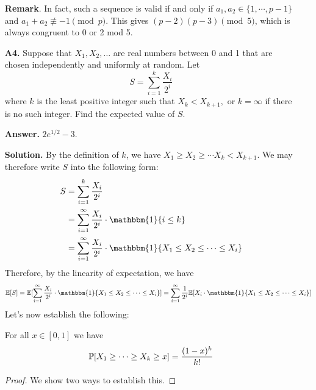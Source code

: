\documentclass[11pt,a4paper]{article}
\begin{document}
\begin{enumerate}
		\textbf{Remark}. In fact, such a sequence is valid if and only if $a_1, a_2\in \{1, \cdots, p-1\}$ and $a_1+a_2\not\equiv -1\pmod{p}$. 
		This gives $(p-2)(p-3)\pmod{5}$, which is always congruent to 0 or 2 mod 5. 
		
		\item [\textbf{A4.}]
		Suppose that $X_1, X_2, \ldots$ are real numbers between 0 and 1 that are chosen independently and uniformly at random. Let \[S=\sum_{i=1}^k \frac{X_i}{2^i}\] 
		where $k$ is the least positive integer such that $X_k<X_{k+1},$ or $k=\infty$ if there is no such integer. Find the expected value of $S.$
		
		\textbf{Answer.} $2e^{1/2}-3$. 
		
		\textbf{Solution.} 
		By the definition of $k$, we have $X_1\ge X_2\ge \cdots X_k < X_{k + 1}$. 
		We may therefore write $S$ into the following form: 
		\begin{align}
			S&=\sum_{i=1}^k \frac{X_i}{2^i} 
			\nonumber\\
			&=\sum_{i=1}^{\infty} \frac{X_i}{2^i} \cdot \mathbbm{1}\{i\le k\}
			\nonumber\\
			&=\sum_{i=1}^{\infty} \frac{X_i}{2^i} \cdot \mathbbm{1}\{X_1\le X_2\le \cdots \le X_i\}
		\end{align}
	    Therefore, by the linearity of expectation, we have 
	    \begin{align}
	    	\bbE[S]
	    	= \bbE[\sum_{i=1}^{\infty} \frac{X_i}{2^i} \cdot \mathbbm{1}\{X_1\le X_2\le \cdots \le X_i\}]
	    	=\sum_{i=1}^{\infty} \frac{1}{2^i} \bbE[ X_i\cdot \mathbbm{1}\{X_1\le X_2\le \cdots \le X_i\}]
	    \end{align}
		Let's now establish the following: 
		\begin{lemma}
			For all $x\in [0, 1]$ we have 
			\begin{equation}
				{\mathbb P}[X_1\ge \cdots \ge X_k\ge x] = \frac{(1-x)^k}{k!}
			\end{equation}
		\end{lemma}
	    \begin{proof}
	    	We show two ways to establish this. 
	    	

\end{proof}
\end{enumerate}
\end{document}
